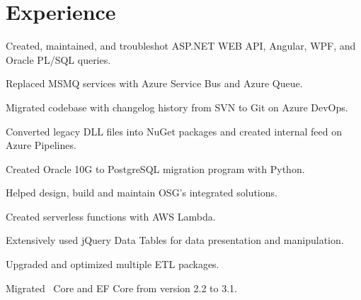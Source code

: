 \documentclass[letterpaper]{cv_12} %
\begin{document}
\begin{minipage}[t]{0.59\textwidth}%


    \section{Experience}


    \vspace{\topsep}
    \begin{tightitemize}
        \item Created, maintained, and troubleshot ASP.NET WEB API, Angular,
        WPF, and Oracle PL/SQL queries.
        \item Replaced MSMQ services with Azure Service Bus and Azure Queue.
        \item Migrated codebase with changelog history from SVN to Git on Azure
        DevOps.
        \item Converted legacy DLL files into NuGet packages and created
        internal feed on Azure Pipelines.
        \item Created Oracle 10G to PostgreSQL migration program
        with Python.
    \end{tightitemize}

    \sectionspace%



    \begin{tightitemize}
        \item Helped design, build and maintain OSG's integrated solutions.
        \item Created serverless functions with AWS Lambda.
        \item Extensively used jQuery Data Tables for data presentation and
        manipulation.
        \item Upgraded and optimized multiple ETL packages.
        \item Migrated \dotnet\ Core and EF Core from version 2.2 to 3.1.
    \end{tightitemize}


\end{minipage}
\end{document}

